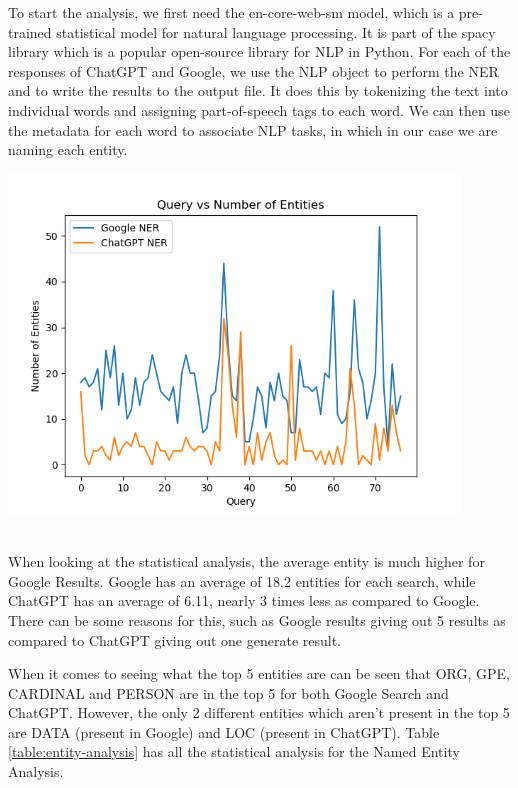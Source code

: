 \documentclass[50pt]{usiinfbachelorproject}
\begin{document}
To start the analysis, we first need the en-core-web-sm model, which is a pre-trained statistical model for natural language processing. It is part of the spacy library which is a popular open-source library for NLP in Python. For each of the responses of ChatGPT and Google, we use the NLP object to perform the NER and to write the results to the output file. It does this by tokenizing the text into individual words and assigning part-of-speech tags to each word. We can then use the metadata for each word to associate NLP tasks, in which in our case we are naming each entity.

\noindent
  \begin{minipage}{\linewidth}
  \centering
  \includegraphics[width=0.9\textwidth]{images/number-of-entities.png}
  \label{fig:name-entity-analysis}
  \end{minipage}
  \\

When looking at the statistical analysis, the average entity is much higher for Google Results. Google has an average of 18.2 entities for each search, while ChatGPT has an average of 6.11, nearly 3 times less as compared to Google. There can be some reasons for this, such as Google results giving out 5 results as compared to ChatGPT giving out one generate result.
  
When it comes to seeing what the top 5 entities are can be seen that ORG, GPE, CARDINAL and PERSON are in the top 5 for both Google Search and ChatGPT. However, the only 2 different entities which aren’t present in the top 5 are DATA (present in Google) and LOC (present in ChatGPT). Table \ref{table:entity-analysis} has all the statistical analysis for the Named Entity Analysis.
\end{document}
